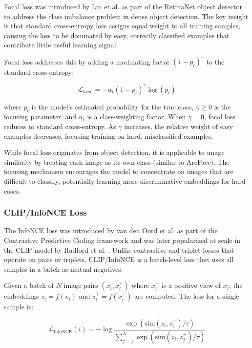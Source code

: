 \documentclass[
    english,
]{VUMIFPSbakalaurinis}
\begin{document}
Focal loss was introduced by Lin et al. \cite{Lin17} as part of the RetinaNet object detector to address the class imbalance problem in dense object detection. The key insight is that standard cross-entropy loss assigns equal weight to all training samples, causing the loss to be dominated by easy, correctly classified examples that contribute little useful learning signal.

Focal loss addresses this by adding a modulating factor $(1 - p_t)^\gamma$ to the standard cross-entropy:

\begin{equation}
\mathcal{L}_{\text{focal}} = -\alpha_t (1 - p_t)^\gamma \log(p_t)
\label{eq:focal}
\end{equation}

where $p_t$ is the model's estimated probability for the true class, $\gamma \geq 0$ is the focusing parameter, and $\alpha_t$ is a class-weighting factor. When $\gamma = 0$, focal loss reduces to standard cross-entropy. As $\gamma$ increases, the relative weight of easy examples decreases, focusing training on hard, misclassified examples.

While focal loss originates from object detection, it is applicable to image similarity by treating each image as its own class (similar to ArcFace). The focusing mechanism encourages the model to concentrate on images that are difficult to classify, potentially learning more discriminative embeddings for hard cases.

\subsubsection{CLIP/InfoNCE Loss}

The InfoNCE loss was introduced by van den Oord et al. \cite{Oor18} as part of the Contrastive Predictive Coding framework and was later popularized at scale in the CLIP model by Radford et al. \cite{Rad21}. Unlike contrastive and triplet losses that operate on pairs or triplets, CLIP/InfoNCE is a batch-level loss that uses all samples in a batch as mutual negatives.

Given a batch of $N$ image pairs $(x_i, x_i^+)$ where $x_i^+$ is a positive view of $x_i$, the embeddings $z_i = f(x_i)$ and $z_i^+ = f(x_i^+)$ are computed. The loss for a single sample is:

\begin{equation}
\mathcal{L}_{\text{InfoNCE}}(i) = -\log \frac{\exp(\text{sim}(z_i, z_i^+) / \tau)}{\sum_{j=1}^{N} \exp(\text{sim}(z_i, z_j^+) / \tau)}
\label{eq:infonce}
\end{equation}
\end{document}
